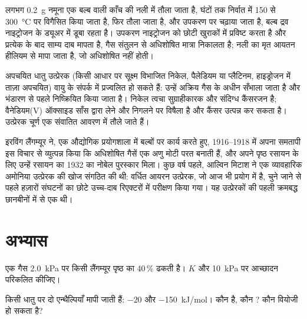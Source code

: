 \begin{inthelab}[एक BET मापन]
लगभग \qty{0.2}{g} नमूना एक बल्ब वाली काँच की नली में तौला जाता है, घंटों तक
निर्वात में 150 से \qty{300}{\celsius} पर विगैसित किया जाता है, फिर तौला जाता है, और
उपकरण पर चढ़ाया जाता है, बल्ब द्रव नाइट्रोजन के ड्यूअर में डूबा रहता है। उपकरण
नाइट्रोजन को छोटी खुराकों में प्रविष्ट करता है और प्रत्येक के बाद साम्य दाब मापता है,
गैस संतुलन से अधिशोषित मात्रा निकालता है; नली का मृत आयतन
हीलियम से मापा जाता है, जो अधिशोषित नहीं होती।
\end{inthelab}

\begin{safety}{}
अपचयित धातु उत्प्रेरक (किसी आधार पर सूक्ष्म विभाजित निकेल, पैलेडियम या प्लैटिनम,
हाइड्रोजन में ताज़ा अपचयित) वायु के संपर्क में प्रज्वलित हो सकते हैं: उन्हें
अक्रिय गैस के अधीन सँभाला जाता है और भंडारण से पहले निष्क्रियित किया जाता है। निकेल त्वचा
सुग्राहीकारक और संदिग्ध कैंसरजन है; वैनेडियम(V) ऑक्साइड साँस द्वारा लेने
और निगलने पर विषैला है और कैंसर उत्पन्न कर सकता है। उत्प्रेरक चूर्ण एक
संवातित आवरण में तौले जाते हैं।
\end{safety}

\begin{history}[लैंगम्यूर और अमोनिया उत्प्रेरक]
इरविंग लैंगम्यूर ने, एक औद्योगिक प्रयोगशाला में बल्बों पर कार्य करते हुए,
1916--1918 में अपना समतापी इस विचार से व्युत्पन्न किया कि अधिशोषित गैसें एक
अणु मोटी परत बनाती हैं, और अपने पृष्ठ रसायन के लिए उन्हें रसायन का 1932 का
नोबेल पुरस्कार मिला। कुछ वर्ष पहले, आल्विन मिटाश ने
एक व्यावहारिक अमोनिया उत्प्रेरक की खोज संगठित की थी: वर्धित आयरन उत्प्रेरक, जो
आज भी प्रयोग में है, चुने जाने से पहले हज़ारों संघटनों का छोटे
उच्च-दाब रिएक्टरों में परीक्षण किया गया। यह उत्प्रेरकों की पहली क्रमबद्ध छानबीनों में से एक थी।
\end{history}

\section{अभ्यास}

\begin{exercise}[$\star$]\label{exo:b3:surfaces-catalysis:1}
एक गैस \qty{2.0}{kPa} पर किसी लैंगम्यूर पृष्ठ का 40\,\% ढकती है। $K$ और
\qty{10}{kPa} पर आच्छादन परिकलित कीजिए।
\end{exercise}

\begin{exercise}[$\star$]\label{exo:b3:surfaces-catalysis:2}
किसी धातु पर दो  एन्थैल्पियाँ मापी जाती हैं: $-20$ और \qty{-150}{kJ/mol}। कौन
 है, कौन ? कौन वियोजी हो सकता है?
\end{exercise}

